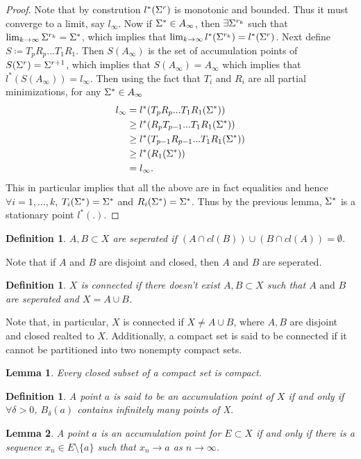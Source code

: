 \documentclass[12pt, leqno]{article}
\def\s{\ensuremath\Sigma}
\newtheorem{lemma}{Lemma}[]
\newtheorem{defn}[thm]{Definition}
\newtheorem{definition}[thm]{Definition}
\begin{document}
\begin{proof}
Note that by constrution $l^*(\s^r)$ is monotonic and bounded. Thus it
must converge to a limit, say $l_{\infty}$. Now if $\s^* \in
A_{\infty}$, then $\exists \s^{r_k}$ such that $\lim_{k \to \infty}
\s^{r_k} = \s^*$, which implies that $\lim_{k \to \infty}l^*(\s^{r_k})
= l^*(\s^r)$. Next define $S \coloneqq T_pR_p ... T_1R_1$. Then
$S(A_{\infty})$ is the set of accumulation points of $S(\s^r) =
\s^{r+1}$, which implies that $S(A_{\infty}) = A_{\infty}$ which
implies that $l^*(S(A_{\infty})) = l_{\infty}$. Then using the fact
that $T_i$ and $R_i$ are all partial minimizations, for any $\s^* \in
A_{\infty}$
\begin{align*}
l_{\infty} &= l^*(T_pR_p...T_1R_1(\s^*)) \\
&\geq l^*(R_pT_{p-1}...T_1R_1(\s^*)) \\
&\geq l^*(T_{p-1}R_{p-1}...T_1R_1(\s^*)) \\
&\geq l^*(R_1(\s^*)) \\
& = l_{\infty}.  
\end{align*}
This in particular implies that all the above are in fact equalities
and hence $\forall i = 1,...,k$, $T_i(\s^*) =
\s^*$ and $R_i(\s^*) = \s^*$. Thus by the previous lemma, $\s^*$ is a
stationary point $l^*(.)$.
\end{proof}
\begin{definition}
$A, B \subset X$ are seperated if $(A \cap cl(B)) \cup (B \cap cl(A))
= \emptyset $.
\end{definition}
Note that if $A$ and $B$ are disjoint and closed,  then $A$ and $B$
are seperated. 
\begin{defn}
$X$ is connected if there doesn't exist $A, B \subset X$ such that $A
\text{ and } B$
are seperated and $X=A \cup B$.
\end{defn}
Note that, in particular, $X$ is connected if $X\not=A \cup B$, where
$A,B$ are disjoint and closed realted to $X$. Additionally, a compact set is said to be connected if it cannot be partitioned into two nonempty compact sets. 
\begin{lemma}
Every closed subset of a compact set is compact. 
\end{lemma}
\begin{defn} \label{defn:accumulationpt}
A point $a$ is said to be an accumulation point of $X$ if and only if 
$\forall \delta>0$, $B_{\delta}(a)$ contains infinitely many points of X.
\end{defn}
\begin{lemma}
A point $a$ is an accumulation point for $E \subset X$ if and only if
there is a sequence $x_n \in E \setminus \{a\}$ such that $x_n \to a$
as $n \to \infty$.
\end{lemma}
\end{document}
